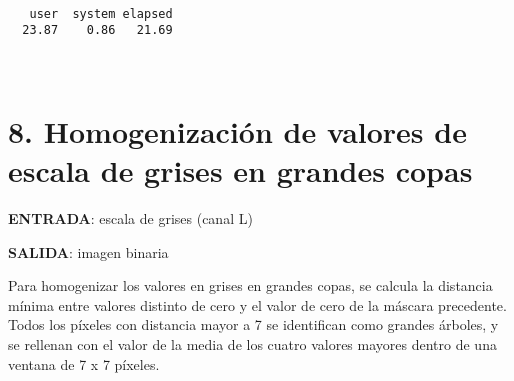     \begin{center}
    \end{center}
    { \hspace*{\fill} \\}
    
    \begin{center}
    \end{center}
    { \hspace*{\fill} \\}
    
    \begin{center}
    \end{center}
    { \hspace*{\fill} \\}
    
    
    \begin{verbatim}
   user  system elapsed 
  23.87    0.86   21.69 
    \end{verbatim}

    
    \begin{center}
    \end{center}
    { \hspace*{\fill} \\}
    
    \hypertarget{homogenizaciuxf3n-de-valores-de-escala-de-grises-en-grandes-copas}{%
\section{8. Homogenización de valores de escala de grises en grandes
copas}\label{homogenizaciuxf3n-de-valores-de-escala-de-grises-en-grandes-copas}}

\textbf{ENTRADA}: escala de grises (canal L)

\textbf{SALIDA}: imagen binaria

Para homogenizar los valores en grises en grandes copas, se calcula la
distancia mínima entre valores distinto de cero y el valor de cero de la
máscara precedente. Todos los píxeles con distancia mayor a 7 se
identifican como grandes árboles, y se rellenan con el valor de la media
de los cuatro valores mayores dentro de una ventana de 7 x 7 píxeles.

    \begin{tcolorbox}[breakable, size=fbox, boxrule=1pt, pad at break*=1mm,colback=cellbackground, colframe=cellborder]
\begin{Verbatim}[commandchars=\\\{\}]

\end{Verbatim}
\end{tcolorbox}

